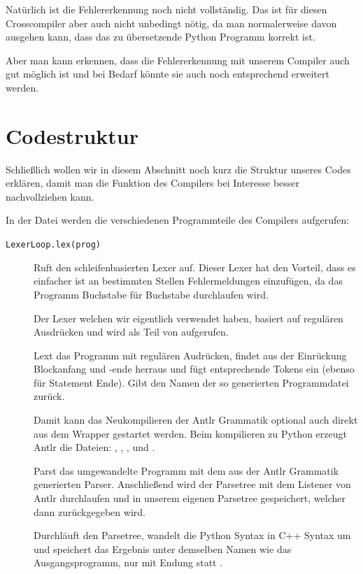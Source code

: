 Natürlich ist die Fehlererkennung noch nicht vollständig. Das ist für diesen Crosscompiler aber auch nicht unbedingt nötig, da man normalerweise davon ausgehen kann, dass das zu übersetzende Python Programm korrekt ist.

Aber man kann erkennen, dass die Fehlererkennung mit unserem Compiler auch gut möglich ist und bei Bedarf könnte sie auch noch entsprechend erweitert werden.






\clearpage

\section{Codestruktur}

Schließlich wollen wir in diesem Abschnitt noch kurz die Struktur unseres Codes erklären, damit man die Funktion des Compilers bei Interesse besser nachvollziehen kann.

In der  Datei  werden die verschiedenen Programmteile des Compilers aufgerufen:

\begin{description}

\item[\texttt{LexerLoop.lex(prog)}] Ruft den schleifenbasierten Lexer auf. Dieser Lexer hat den Vorteil, dass es einfacher ist an bestimmten Stellen Fehlermeldungen einzufügen, da das Programm Buchstabe für Buchstabe durchlaufen wird.

 Der Lexer welchen wir eigentlich verwendet haben, basiert auf regulären Ausdrücken und wird als Teil von  aufgerufen.
 
\item[] Lext das Programm mit regulären Audrücken, findet aus der Einrückung Blockanfang und -ende herraus und fügt entsprechende Tokens ein (ebenso für Statement Ende). Gibt den Namen der so generierten Programmdatei zurück.

\item[] Damit kann das Neukompilieren der Antlr Grammatik  optional  auch direkt aus dem  Wrapper gestartet werden. Beim kompilieren zu Python erzeugt Antlr die Dateien: , , ,  und  .

\item[] Parst das umgewandelte Programm  mit dem aus der Antlr Grammatik generierten Parser. Anschließend wird der Parsetree mit dem Listener von Antlr durchlaufen und in unserem eigenen Parsetree gespeichert, welcher dann zurückgegeben wird.


\item[] Durchläuft den Parsetree, wandelt die Python Syntax in C++ Syntax um und speichert das Ergebnis unter demselben Namen wie das Ausgangsprogramm, nur mit Endung  statt .

\end{description}

